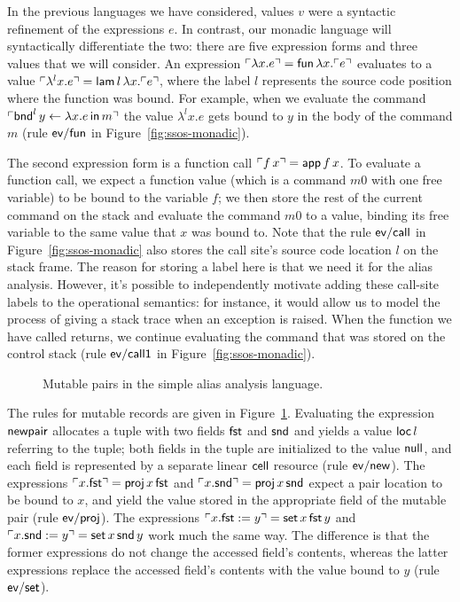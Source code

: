 In the previous languages we have considered, values $v$ were a
syntactic refinement of the expressions $e$. In contrast, our monadic
language will syntactically differentiate the two: there are five
expression forms and three values that we will consider. An expression
${\ulcorner{\lambda x.e}\urcorner} = {\sf fun}\,\lambda x.{\ulcorner{e}\urcorner}$ evaluates to
a value ${\ulcorner{\lambda^l x.e}\urcorner} = {\sf lam}\,l\,\lambda x.{\ulcorner{e}\urcorner}$,
where the label $l$ represents the source code position where the
function was bound. For example, when we evaluate the command
${\ulcorner{{\sf bnd}^l \, y \leftarrow \lambda x.e \,{\sf in}\,m}\urcorner}$ the
value $\lambda^l x.e$ gets bound to $y$ in the body of the command $m$
(rule ${\sf ev/fun}$ in Figure~\ref{fig:ssos-monadic}).

The second expression form is a function call ${\ulcorner{f\,x}\urcorner} = {\sf
  app}\,f\,x$. To evaluate a function call, we expect a function value
(which is a command $m0$ with one free variable) to be bound to the
variable $f$; we then store the rest of the current command on the
stack and evaluate the command $m0$ to a value, binding its free
variable to the same value that $x$ was bound to. Note that the rule
${\sf ev/call}$ in Figure~\ref{fig:ssos-monadic} also stores the call
site's source code location $l$ on the stack frame. The reason for
storing a label here is that we need it for the alias
analysis. However, it's possible to independently motivate adding
these call-site labels to the operational semantics: for instance, it
would allow us to model the process of giving a stack trace when an
exception is raised. When the function we have called returns, we
continue evaluating the command that was stored on the control stack
(rule ${\sf ev/call1}$ in Figure~\ref{fig:ssos-monadic}).

\begin{figure}
\caption{Mutable pairs in the simple alias analysis language.}
\label{fig:ssos-monadic2}
\end{figure}

The rules for mutable records are given in
Figure~\ref{fig:ssos-monadic2}. Evaluating the expression ${\sf
  newpair}$ allocates a tuple with two fields ${\sf fst}$ and ${\sf
  snd}$ and yields a value ${\sf loc}\,l$ referring to the tuple; both
fields in the tuple are initialized to the value ${\sf null}$, and
each field is represented by a separate linear ${\sf cell}$ resource
(rule ${\sf ev/new}$). The expressions ${\ulcorner{x.{\sf fst}}\urcorner} = {\sf
  proj}\,x\,{\sf fst}$ and ${\ulcorner{x.{\sf snd}}\urcorner} = {\sf proj}\,x\,{\sf
  snd}$ expect a pair location to be bound to $x$, and yield the value
stored in the appropriate field of the mutable pair (rule ${\sf
  ev/proj}$). The expressions ${\ulcorner{x.{\sf fst} := y}\urcorner} = {\sf
  set}\,x\,{\sf fst}\,y$ and ${\ulcorner{x.{\sf snd} := y}\urcorner} = {\sf
  set}\,x\,{\sf snd}\,y$ work much the same way. The difference is
that the former expressions do not change the accessed field's
contents, whereas the latter expressions replace the accessed field's
contents with the value bound to $y$ (rule ${\sf ev/set}$).

